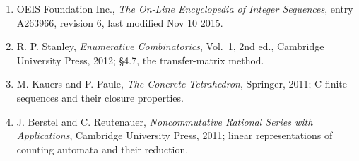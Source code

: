 \documentclass[11pt]{article}
\theoremstyle{definition}
\begin{document}
\begin{enumerate}

\item OEIS Foundation Inc., \emph{The On-Line Encyclopedia of Integer Sequences}, entry \href{https://oeis.org/A263966}{A263966}, revision 6, last modified Nov 10 2015.

\item R. P. Stanley, \emph{Enumerative Combinatorics}, Vol.~1, 2nd ed., Cambridge University Press, 2012; \S4.7, the transfer-matrix method.

\item M. Kauers and P. Paule, \emph{The Concrete Tetrahedron}, Springer, 2011; C-finite sequences and their closure properties.

\item J. Berstel and C. Reutenauer, \emph{Noncommutative Rational Series with Applications}, Cambridge University Press, 2011; linear representations of counting automata and their reduction.

\end{enumerate}
\end{document}
